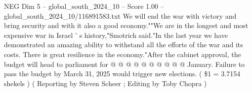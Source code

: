 \begin{textsample}{NEG Dim 5 – global\_south\_2024\_10 – Score 1.00 – global\_south\_2024\_10/116891583.txt}
We will end the war with victory and bring security and with it also a good economy.""We are in the longest and most expensive war in Israel ' s history,"Smotrich said."In the last year we have demonstrated an amazing ability to withstand all the efforts of the war and its costs.
There is great resilience in the economy."After the cabinet approval, the budget will head to parliament for @ @ @ @ @ @ @ @ @ @ January.
Failure to pass the budget by March 31, 2025 would trigger new elections. ( \$1 = 3.7154 shekels ) ( Reporting by Steven Scheer ; Editing by Toby Chopra )

\end{textsample}
